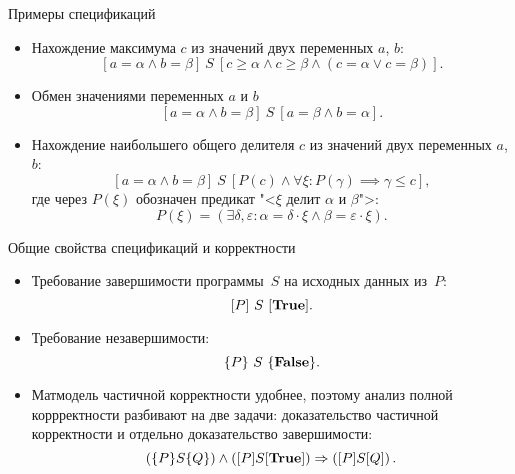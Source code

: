 \documentclass[landscape]{slides}
\begin{document}
\begin{slide}
Примеры спецификаций
\begin{itemize}
\item Нахождение максимума $c$ из значений двух переменных $a$, $b$:
        \[
                [a = \alpha \land b = \beta]
                \ S \ 
                [
                        c \geqslant \alpha \land
                        c \geqslant \beta \land
                        (c = \alpha \lor c = \beta)
                ] .
        \]
\item Обмен значениями переменных $a$ и $b$
        \[
                [a = \alpha \land b = \beta]
                \ S \ 
                [a = \beta \land b = \alpha] .
        \]
\item Нахождение наибольшего общего делителя $c$ из значений двух переменных $a$, $b$:
        \[
                [a = \alpha \land b = \beta]
                \ S \ 
                [
                        P(c) \land
                        \forall \xi : P(\gamma) \implies \gamma \leqslant c
                ] ,
        \]
        где через $P(\xi)$ обозначен предикат "<$\xi$ делит $\alpha$ и $\beta$">:
        \[
                P(\xi) = (\exists \delta, \varepsilon : \alpha = \delta\cdot \xi \land \beta = \varepsilon\cdot \xi).
        \]
\end{itemize}
\end{slide}

\begin{slide}
Общие свойства спецификаций и корректности
\begin{itemize}
\item Требование завершимости программы~$S$ на исходных данных из~$P$:
        \[
                [P] \  S \  [\mathbf{True}] .
        \]
\item Требование незавершимости:
        \[
                \{P\} \  S \  \{\mathbf{False}\} .
        \]
\item Матмодель частичной корректности удобнее, поэтому анализ полной коррректности
        разбивают на две задачи: доказательство частичной корректности и отдельно
        доказательство завершимости:
        \[
                \left(\{P\} S \{Q\}\right)
                \land 
                \left([P] S [\mathbf{True}]\right)
                \Rightarrow
                \left([P] S [Q]\right) .
        \]
\end{itemize}
\end{slide}
\end{document}
